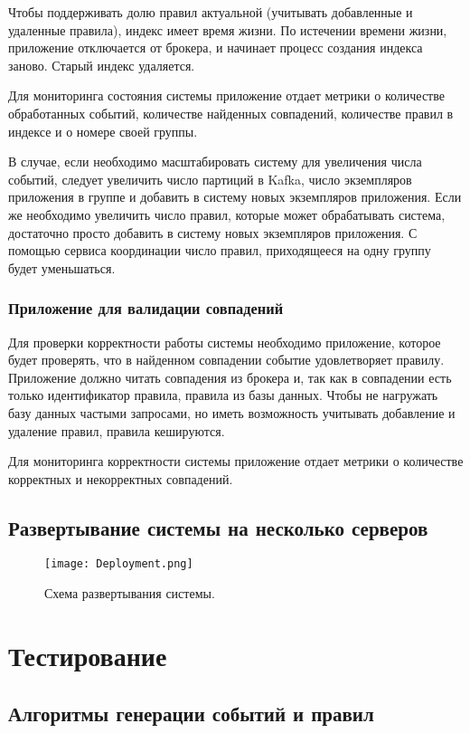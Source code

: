 \documentclass[14pt]{article}
\begin{document}
Чтобы поддерживать долю правил актуальной (учитывать добавленные и удаленные правила), индекс имеет время жизни. По истечении времени жизни, приложение отключается от брокера, и начинает процесс создания индекса заново. Старый индекс удаляется.

\bigskip
\bigskip

Для мониторинга состояния системы приложение отдает метрики о количестве обработанных событий, количестве найденных совпадений, количестве правил в индексе и о номере своей группы.

В случае, если необходимо масштабировать систему для увеличения числа событий, следует увеличить число партиций в Kafka, число экземпляров приложения в группе и добавить в систему новых экземпляров приложения. Если же необходимо увеличить число правил, которые может обрабатывать система, достаточно просто добавить в систему новых экземпляров приложения. С помощью сервиса координации число правил, приходящееся на одну группу будет уменьшаться.

\subsubsection{Приложение для валидации совпадений}
Для проверки корректности работы системы необходимо приложение, которое будет проверять, что в найденном совпадении событие удовлетворяет правилу. Приложение должно читать совпадения из брокера и, так как в совпадении есть только идентификатор правила, правила из базы данных. Чтобы не нагружать базу данных частыми запросами, но иметь возможность учитывать добавление и удаление правил, правила кешируются.

Для мониторинга корректности системы приложение отдает метрики о количестве корректных и некорректных совпадений.

\subsection{Развертывание системы на несколько серверов}
\begin{figure}[h]
  \centering
    \texttt{[image: Deployment.png]}
    \caption{Схема развертывания системы.}
    \label{fig:deployment}
\end{figure}

\section{Тестирование}
\label{section:testing}
\subsection{Алгоритмы генерации событий и правил}
\end{document}

